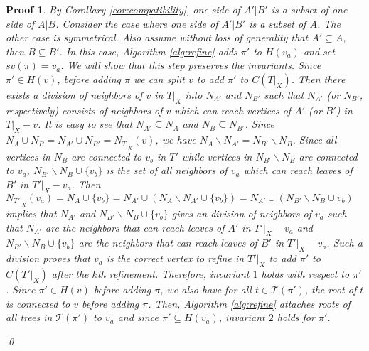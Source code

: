 \documentclass{bmcart}
\theoremstyle{mystyle}
\theoremstyle{proofstyle}
\newtheorem*{proof2}{Proof}
\newenvironment{proofnospace}{\begin{proof2}}{\qed \end{proof2}}
\begin{document}
\begin{proofnospace}
    By Corollary \ref{cor:compatibility}, one side of $A'|B'$ is a subset of one side of $A|B$. Consider the case where one side of $A'|B'$ is a subset of $A$. The other case is symmetrical. Also assume without loss of generality that $A' \subseteq A$, then $B \subseteq B'$. In this case, Algorithm \ref{alg:refine} adds $\pi'$ to $H(v_a)$ and set $sv(\pi) = v_a$. We will show that this step preserves the invariants. Since $\pi' \in H(v)$, before adding $\pi$ we can split $v$ to add $\pi'$ to $C(T|_X)$. Then there exists a division of neighbors of $v$ in $T|_X$ into $N_{A'}$ and $N_{B'}$ such that $N_{A'}$ (or $N_{B'}$, respectively) consists of neighbors of $v$ which can reach vertices of $A'$ (or $B'$) in $T|_X - v$. It is easy to see that $N_{A'} \subseteq N_A$ and $N_B \subseteq N_{B'}$. Since $N_A \cup N_B = N_{A'} \cup N_{B'} = N_{T|_X}(v)$, we have $N_A \backslash N_{A'} = N_{B'} \backslash N_B$. Since all vertices in $N_B$ are connected to $v_b$ in $T'$ while vertices in $N_{B'} \backslash N_B$ are connected to $v_a$, $N_{B'} \backslash N_B \cup \{v_b\}$ is the set of all neighbors of $v_a$ which can reach leaves of $B'$ in $T'|_X - v_a$. Then $N_{T'|_X}(v_a) = N_A \cup \{v_b\} = N_{A'} \cup (N_A \backslash N_{A'} \cup \{v_b\}) = N_{A'} \cup (N_{B'} \backslash N_B \cup v_b)$ implies that $N_{A'}$ and $N_{B'} \backslash N_B \cup \{v_b\}$ gives an division of neighbors of $v_a$ such that $N_{A'}$ are the neighbors that can reach leaves of $A'$ in $T'|_X -v_a$ and $N_{B'} \backslash N_B \cup \{v_b\}$ are the neighbors that can reach leaves of $B'$ in $T'|_X -v_a$. Such a division proves that $v_a$ is the correct vertex to refine in $T'|_X$ to add $\pi'$ to $C(T'|_X)$ after the $k$th refinement. Therefore, invariant $1$ holds with respect to $\pi'$. Since $\pi' \in H(v)$ before adding $\pi$, we also have for all $t \in \mathcal{T}(\pi')$, the root of $t$ is connected to $v$ before adding $\pi$. Then, Algorithm \ref{alg:refine} attaches roots of all trees in $\mathcal{T}(\pi')$ to $v_a$ and since $\pi' \subseteq H(v_a)$, invariant $2$ holds for $\pi'$. \smallskip


\end{proofnospace}
\end{document}
